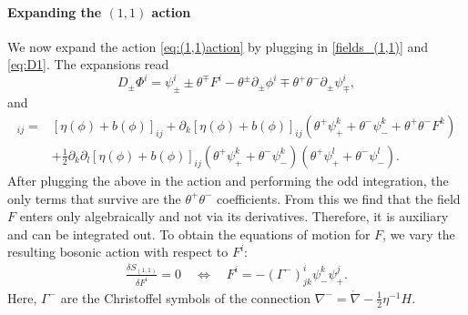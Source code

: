 \documentclass{article}
\newcommand{\lc}{\mathring{\n}}
\newcommand{\p}{\partial}
\newcommand{\n}{\nabla}
\theoremstyle{definition}
\theoremstyle{remark}
\begin{document}
\paragraph{Expanding the $(1,1)$ action}
We now expand the action \eqref{eq:(1,1)action} by plugging in \eqref{fields_(1,1)} and \eqref{eq:D1}. The expansions read
\[
D_\pm\Phi^i =\psi^i_\pm\pm\theta^\mp F^i-\theta^\pm\p_\pm\phi^i\mp\theta^+\theta^-\p_\pm\psi^i_\mp,
\]
and
\begin{align*}
[\eta(\Phi)+b(\Phi)]_{ij} = & [\eta(\phi)+b(\phi)]_{ij}+\p_k[\eta(\phi)+b(\phi)]_{ij}(\theta^+\psi_+^k+\theta^-\psi_-^k+\theta^+\theta^-F^k)\\
& +\frac{1}{2}\p_k\p_l[\eta(\phi)+b(\phi)]_{ij}(\theta^+\psi_+^k+\theta^-\psi_-^k)(\theta^+\psi_+^l+\theta^-\psi_-^l).
\end{align*}
After plugging the above in the action and performing the odd integration, the only terms that survive are the $\theta^+\theta^-$ coefficients. From this we find that
the field $F$ enters only algebraically and not via its derivatives. Therefore, it is auxiliary and can be integrated out. To obtain the equations of motion for $F$,
we vary the resulting bosonic action with respect to $F^i$:
\begin{align} \label{F_EoM}
\frac{\delta S_{(1,1)}}{\delta F^i}=0\quad \Longleftrightarrow\quad  F^i=-(\Gamma^-)^i_{jk}\psi^k_-\psi^j_+.
\end{align}
Here, $\Gamma^-$ are the Christoffel symbols of the connection $\n^-=\lc-\frac{1}{2}\eta^{-1}H$.
\end{document}
